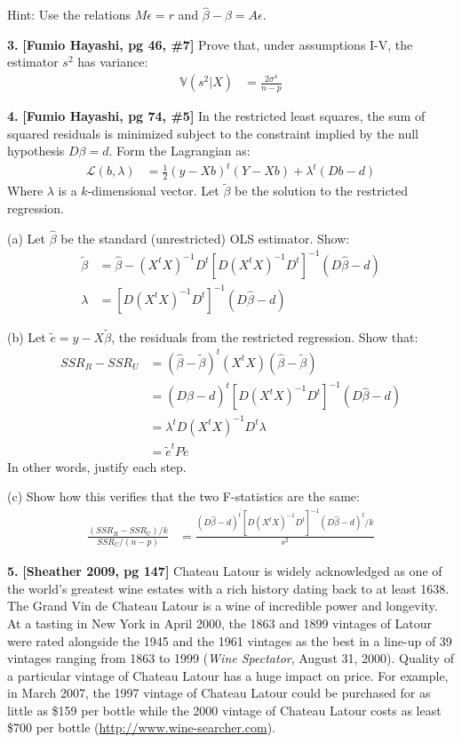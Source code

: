 \documentclass[12pt]{article}
\begin{document}
Hint: Use the relations $M\epsilon = r$ and $\widehat{\beta} - \beta = A\epsilon$.

{\bf 3.} {\bf [Fumio Hayashi, pg 46, \#7]} Prove that, under assumptions I-V, the
estimator $s^2$ has variance:
\begin{align}
\mathbb{V} (s^2 | X) &= \frac{2 \sigma^4}{n - p}
\end{align}

{\bf 4.} {\bf [Fumio Hayashi, pg 74, \#5]} In the restricted least squares, the sum of squared residuals is minimized subject to the constraint implied by the null hypothesis $D\beta = d$. Form the Lagrangian as:
\begin{align}
\mathcal{L}(b, \lambda) &= \frac{1}{2} ( y - Xb )^t ( Y - X b) + \lambda^t (D b - d)
\end{align}
Where $\lambda$ is a $k$-dimensional vector. Let $\widetilde{\beta}$ be the solution to the restricted regression.

(a) Let $\widehat{\beta}$ be the standard (unrestricted) OLS estimator. Show:
\begin{align}
\widetilde{\beta}
&= \widehat{\beta} - (X^t X)^{-1} D^t \left[D (X^t X)^{-1} D^t\right]^{-1} (D \widehat{\beta} - d) \\
\lambda &= \left[ D (X^t X)^{-1} D^t \right]^{-1} (D\widehat{\beta} - d)
\end{align}

(b) Let $\widetilde{e} = y - X\widetilde{\beta}$, the residuals from the restricted regression.
Show that:
\begin{align}
SSR_R - SSR_U &= (\widehat{\beta} - \widetilde{\beta})^t (X^t X) (\widehat{\beta} - \widetilde{\beta}) \\
&= (D \widehat{\beta} - d)^t \left[ D (X^t X)^{-1} D^t \right]^{-1} (D \widehat{\beta} - d) \\
&= \lambda^t D (X^t X)^{-1} D^t \lambda \\
&= \widetilde{e}^t P \widetilde{e}
\end{align}
In other words, justify each step.

(c) Show how this verifies that the two F-statistics are the same:
\begin{align}
\frac{(SSR_R - SSR_U) / k}{SSR_U / (n - p)} &=
\frac{(D \widehat{\beta} - d)^t  [ D (X^t X)^{-1} D^t ]^{-1} (D \widehat{\beta} - d)^t / k}{s^2}
\end{align}


{\bf 5.} {\bf [Sheather 2009, pg 147]} Chateau Latour is widely acknowledged as one of the world’s greatest wine estates with a rich history dating back to at least 1638. The Grand Vin de Chateau Latour is a wine of incredible power and longevity. At a tasting in New York in April 2000, the 1863 and 1899 vintages of Latour were rated alongside the 1945 and the 1961 vintages as the best in a line-up of 39 vintages ranging from 1863 to 1999 ({\it Wine Spectator}, August 31, 2000). Quality of a particular vintage of Chateau Latour has a huge impact on price. For example, in March 2007, the 1997 vintage of Chateau Latour could be purchased for as little as \$159 per bottle while the 2000 vintage of Chateau Latour costs as least \$700 per bottle (\url{http://www.wine-searcher.com}).
\end{document}
